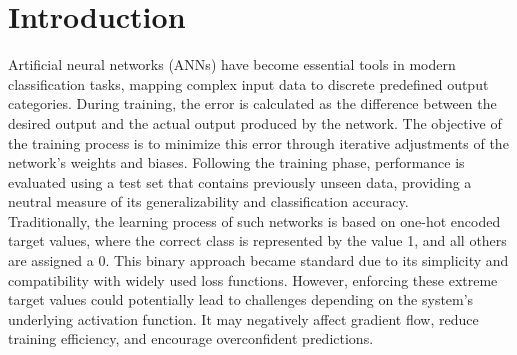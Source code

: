 \documentclass[12pt,fleqn,a4paper]{article}
\begin{document}

\vspace{4em}

\section{Introduction}
Artificial neural networks (ANNs) have become essential tools in modern classification tasks, mapping complex input data to discrete predefined output categories. During training, the error is calculated as the difference between the desired output and the actual output produced by the network. The objective of the training process is to minimize this error through iterative adjustments of the network's weights and biases. Following the training phase, performance is evaluated using a test set that contains previously unseen data, providing a neutral measure of its generalizability and classification accuracy. \\

Traditionally, the learning process of such networks is based on one-hot encoded target values, where the correct class is represented by the value 1, and all others are assigned a 0. This binary approach became standard due to its simplicity and compatibility with widely used loss functions. However, enforcing these extreme target values could potentially lead to challenges depending on the system's underlying activation function. It may negatively affect gradient flow, reduce training efficiency, and encourage overconfident predictions. \\
\end{document}
